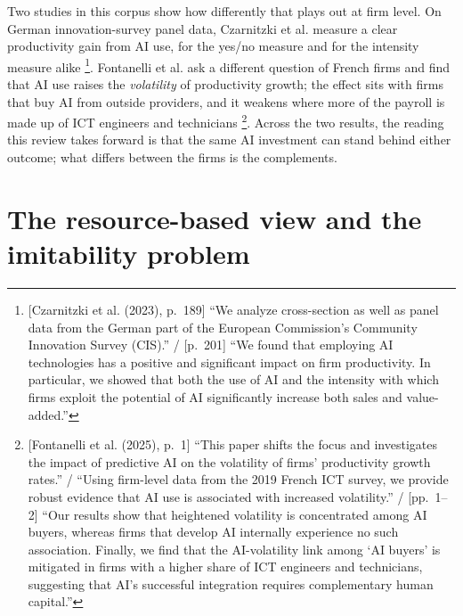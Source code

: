 Two studies in this corpus show how differently that plays out at firm level. On German
innovation-survey panel data, Czarnitzki et al. measure a clear productivity gain from
AI use, for the yes/no measure and for the intensity measure
alike \parencite[pp.~189, 201]{czarnitzki2023artificial}\footnote{[Czarnitzki et al.
(2023), p.~189] ``We analyze cross-section as well as panel data from the German part of
the European Commission's Community Innovation Survey (CIS).'' / [p.~201] ``We found
that employing AI technologies has a positive and significant impact
on firm productivity. In particular, we showed that both the use of AI and the intensity
with which firms exploit the potential of AI significantly increase both sales and
value-added.''}. Fontanelli et al. ask a different question of French firms and find
that AI use raises the \emph{volatility} of productivity growth; the effect sits with
firms that buy AI from outside providers, and it weakens where more of the payroll is
made up of ICT engineers and
technicians \parencite[pp.~1--2]{fontanelli2025predictive}\footnote{[Fontanelli et al.
(2025), p.~1] ``This paper shifts the focus and investigates the impact of predictive AI
on the volatility of firms' productivity growth rates.'' / ``Using firm-level data from
the 2019 French ICT survey, we provide robust evidence that AI use is associated with
increased volatility.'' / [pp.~1--2] ``Our results show that heightened volatility is concentrated among AI
buyers, whereas firms that develop AI internally experience no such association.
Finally, we find that the AI-volatility link among `AI buyers' is mitigated in firms
with a higher share of ICT engineers and technicians, suggesting that AI's successful
integration requires complementary human capital.''}. Across the two results, the
reading this review takes forward is that the same AI investment can stand behind
either outcome; what differs between the firms is the complements.

\section{The resource-based view and the imitability problem}
\label{sec:rbv}

